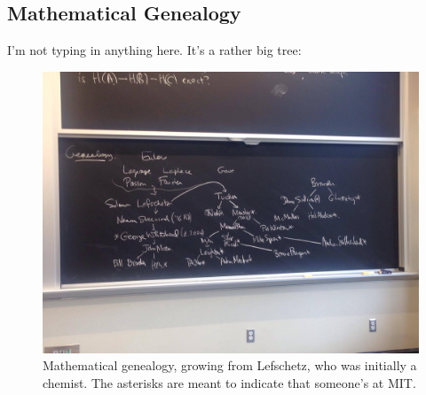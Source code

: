\subsection{Mathematical Genealogy}
I'm not typing in anything here. It's a rather big tree:
\begin{figure}[H]
\centering
\includegraphics[width=\textwidth]{math-family}
\caption{Mathematical genealogy, growing from Lefschetz, who was initially a chemist. The asterisks are meant to indicate that someone's at MIT.}
\end{figure}
